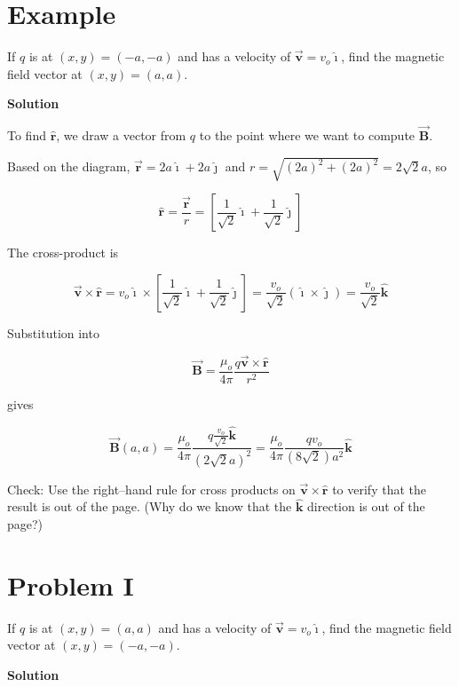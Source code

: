 \documentclass{article}
\newcommand{\ihat}[0]{\hat{\boldsymbol{\imath}}}
\newcommand{\jhat}[0]{\hat{\boldsymbol{\jmath}}}
\newcommand{\khat}[0]{\hat{\boldsymbol{k}}}
\newcommand{\bfvec}[1]{\vec{\mathbf{#1}}}
\begin{document}
\ifsolutions

\else

\newpage
\fi

\section{Example}

If $q$ is at $(x,y)=(-a,-a)$ and has a velocity of $\bfvec{v}=v_o\ihat$, find the magnetic field vector at $(x,y)=(a,a)$.

\textbf{Solution}

To find $\hat{\mathbf{r}}$, we draw a vector from $q$ to the point where we want to compute $\bfvec{B}$.



Based on the diagram, $\bfvec{r}=2a\ihat + 2a\jhat$ and $r = \sqrt{(2a)^2+(2a)^2}=2\sqrt{2}a$, so

$$\hat{\mathbf{r}}=\frac{\bfvec{r}}{r} = \left[\frac{1}{\sqrt{2}}\ihat + \frac{1}{\sqrt{2}}\jhat\right]$$

The cross-product is

$$\bfvec{v}\times\hat{\mathbf{r}} = v_o\ihat\times\left[\frac{1}{\sqrt{2}}\ihat + \frac{1}{\sqrt{2}}\jhat\right] = \frac{v_o}{\sqrt{2}}(\ihat\times\jhat) = \frac{v_o}{\sqrt{2}}\khat$$

Substitution into 

$$\bfvec{B} = \frac{\mu_o}{4\pi}\frac{q\bfvec{v}\times\hat{\mathbf{r}}}{r^2}$$

gives

$$\bfvec{B}(a,a) = \frac{\mu_o}{4\pi} \frac{q\frac{v_o}{\sqrt{2}}\khat}{(2\sqrt{2}a)^2} = \frac{\mu_o}{4\pi} \frac{qv_o}{(8\sqrt{2})a^2}\khat$$

Check: Use the right--hand rule for cross products on $\bfvec{v}\times\hat{\mathbf{r}}$ to verify that the result is out of the page. (Why do we know that the $\khat$ direction is out of the page?)

\ifsolutions

\else

\newpage
\fi

\section{Problem I}

If $q$ is at $(x,y)=(a,a)$ and has a velocity of $\bfvec{v}=v_o\ihat$, find the magnetic field vector at $(x,y)=(-a,-a)$.

\ifsolutions
\textbf{Solution}
\end{document}
